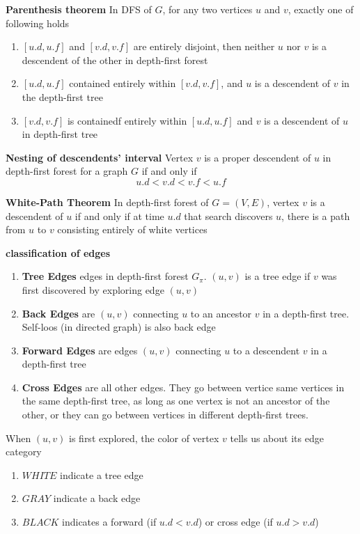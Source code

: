 \documentclass[11pt]{article}
\begin{document}
\begin{theorem*}
    \textbf{Parenthesis theorem} In DFS of $G$, for any two vertices $u$ and $v$, exactly one of following holds 
    \begin{enumerate}
        \item $[u.d, u.f]$ and $[v.d, v.f]$ are entirely disjoint, then neither $u$ nor $v$ is a descendent of the other in depth-first forest 
        \item $[u.d, u.f]$ contained entirely within $[v.d, v.f]$, and $u$ is a descendent of $v$ in the depth-first tree 
        \item $[v.d, v.f]$ is containedf entirely within $[u.d, u.f]$ and $v$ is a descendent of $u$ in depth-first tree
    \end{enumerate}
\end{theorem*}


\begin{corollary*}
    \textbf{Nesting of descendents' interval} Vertex $v$ is a proper descendent of $u$ in depth-first forest for a graph $G$ if and only if 
    \[
        u.d < v.d < v.f < u.f
    \]
\end{corollary*}


\begin{theorem*}
    \textbf{White-Path Theorem} In depth-first forest of $G = (V,E)$, vertex $v$ is a descendent of $u$ if and only if at time $u.d$ that search discovers $u$, there is a path from $u$ to $v$ consisting entirely of white vertices
\end{theorem*}

\begin{proposition*}
    \textbf{classification of edges}
    \begin{enumerate}
        \item \textbf{Tree Edges} edges in depth-first forest $G_{\pi}$. $(u,v)$ is a tree edge if $v$ was first discovered by exploring edge $(u,v)$
        \item \textbf{Back Edges} are $(u,v)$ connecting $u$ to an ancestor $v$ in a depth-first tree. Self-loos (in directed graph) is also back edge 
        \item \textbf{Forward Edges} are edges $(u,v)$ connecting $u$ to a descendent $v$ in a depth-first tree 
        \item \textbf{Cross Edges} are all other edges. They go between vertice same vertices in the same depth-first tree, as long as one vertex is not an ancestor of the other, or they can go between vertices in different depth-first trees.
    \end{enumerate}
    When $(u,v)$ is first explored, the color of vertex $v$ tells us about its edge category
    \begin{enumerate}
        \item $WHITE$ indicate a tree edge 
        \item $GRAY$ indicate a back edge 
        \item $BLACK$ indicates a forward (if $u.d < v.d$) or cross edge (if $u.d > v.d$)
    \end{enumerate}
\end{proposition*}
\end{document}
